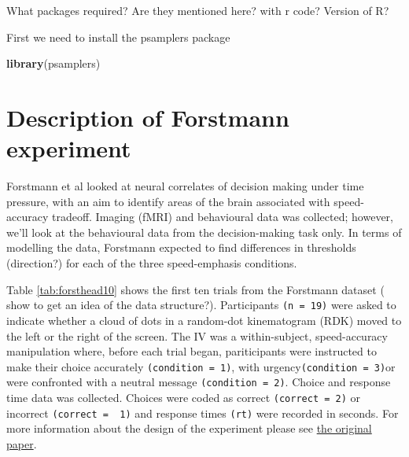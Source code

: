 \documentclass[]{book}
\newenvironment{Shaded}{\begin{snugshade}}{\end{snugshade}}
\newcommand{\KeywordTok}[1]{\textcolor[rgb]{0.13,0.29,0.53}{\textbf{#1}}}
\newcommand{\NormalTok}[1]{#1}
\begin{document}
What packages required? Are they mentioned here? with r code? Version of
R?

First we need to install the psamplers package

\begin{Shaded}
\begin{Highlighting}[]
\KeywordTok{library}\NormalTok{(psamplers)}
\end{Highlighting}
\end{Shaded}

\section{Description of Forstmann
experiment}\label{description-of-forstmann-experiment}

Forstmann et al looked at neural correlates of decision making under
time pressure, with an aim to identify areas of the brain associated
with speed-accuracy tradeoff. Imaging (fMRI) and behavioural data was
collected; however, we'll look at the behavioural data from the
decision-making task only. In terms of modelling the data, Forstmann
expected to find differences in thresholds (direction?) for each of the
three speed-emphasis conditions.

Table \ref{tab:forsthead10} shows the first ten trials from the
Forstmann dataset ( show to get an idea of the data structure?).
Participants \texttt{(n\ =\ 19)} were asked to indicate whether a cloud
of dots in a random-dot kinematogram (RDK) moved to the left or the
right of the screen. The IV was a within-subject, speed-accuracy
manipulation where, before each trial began, pariticipants were
instructed to make their choice accurately \texttt{(condition\ =\ 1)},
with urgency\texttt{(condition\ =\ 3)}or were confronted with a neutral
message \texttt{(condition\ =\ 2)}. Choice and response time data was
collected. Choices were coded as correct \texttt{(correct\ =\ 2)} or
incorrect \texttt{(correct\ =\ \ 1)} and response times \texttt{(rt)}
were recorded in seconds. For more information about the design of the
experiment please see
\href{https://www.pnas.org/content/105/45/17538.short}{the original
paper}.
\end{document}
